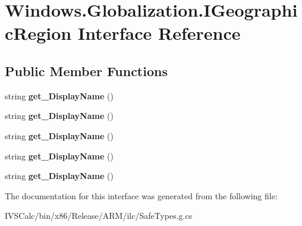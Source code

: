 \hypertarget{interface_windows_1_1_globalization_1_1_i_geographic_region}{}\section{Windows.\+Globalization.\+I\+Geographic\+Region Interface Reference}
\label{interface_windows_1_1_globalization_1_1_i_geographic_region}
\subsection*{Public Member Functions}
\begin{DoxyCompactItemize}
\item 
\mbox{\label{interface_windows_1_1_globalization_1_1_i_geographic_region_ac94e93d67802b6f8cb080d51fd2b58c3}} 
string {\bfseries get\+\_\+\+Display\+Name} ()
\item 
\mbox{\label{interface_windows_1_1_globalization_1_1_i_geographic_region_ac94e93d67802b6f8cb080d51fd2b58c3}} 
string {\bfseries get\+\_\+\+Display\+Name} ()
\item 
\mbox{\label{interface_windows_1_1_globalization_1_1_i_geographic_region_ac94e93d67802b6f8cb080d51fd2b58c3}} 
string {\bfseries get\+\_\+\+Display\+Name} ()
\item 
\mbox{\label{interface_windows_1_1_globalization_1_1_i_geographic_region_ac94e93d67802b6f8cb080d51fd2b58c3}} 
string {\bfseries get\+\_\+\+Display\+Name} ()
\item 
\mbox{\label{interface_windows_1_1_globalization_1_1_i_geographic_region_ac94e93d67802b6f8cb080d51fd2b58c3}} 
string {\bfseries get\+\_\+\+Display\+Name} ()
\end{DoxyCompactItemize}


The documentation for this interface was generated from the following file\+:\begin{DoxyCompactItemize}
\item 
I\+V\+S\+Calc/bin/x86/\+Release/\+A\+R\+M/ilc/Safe\+Types.\+g.\+cs\end{DoxyCompactItemize}
